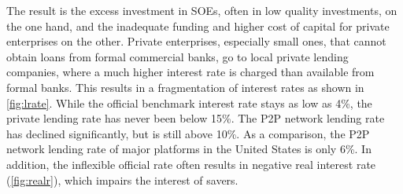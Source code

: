 \documentclass[AER]{AEA}
\begin{document}



The result is the excess investment in SOEs, often in low quality investments,
on the one hand, and the inadequate funding and higher cost of capital for private 
enterprises on the other. Private enterprises, especially small ones, 
that cannot obtain loans from formal commercial banks, go to local 
private lending companies, where a much higher interest rate is charged 
than available from formal banks. 
This results in a fragmentation of interest rates as 
shown in \autoref{fig:lrate}. While the official benchmark interest rate 
stays as low as 4\%, the private lending rate has never been 
below 15\%. The P2P network lending rate has declined significantly, 
but is still above 10\%. As a comparison, the P2P network lending rate 
of major platforms in the United States is only 6\%. 
In addition, the inflexible official rate often results in negative real 
interest rate (\autoref{fig:realr}), which impairs the interest of savers.
\end{document}

